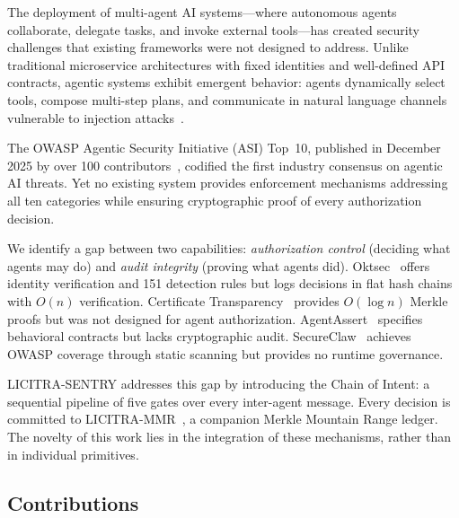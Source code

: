 \documentclass[11pt,a4paper]{article}
\begin{document}
The deployment of multi-agent AI systems---where autonomous agents collaborate, delegate
tasks, and invoke external tools---has created security challenges that existing frameworks
were not designed to address. Unlike traditional microservice architectures with fixed
identities and well-defined API contracts, agentic systems exhibit emergent behavior: agents
dynamically select tools, compose multi-step plans, and communicate in natural language
channels vulnerable to injection attacks~\cite{owasp}.

The OWASP Agentic Security Initiative (ASI) Top~10, published in December 2025 by over
100 contributors~\cite{owasp}, codified the first industry consensus on agentic AI threats.
Yet no existing system provides enforcement mechanisms addressing all ten categories while ensuring
cryptographic proof of every authorization decision.

We identify a gap between two capabilities: \emph{authorization control} (deciding what
agents may do) and \emph{audit integrity} (proving what agents did). Oktsec~\cite{oktsec}
offers identity verification and 151 detection rules but logs decisions in flat hash chains
with $O(n)$ verification. Certificate Transparency~\cite{ct} provides $O(\log n)$ Merkle
proofs but was not designed for agent authorization. AgentAssert~\cite{agentassert} specifies
behavioral contracts but lacks cryptographic audit. SecureClaw~\cite{secureclaw} achieves
OWASP coverage through static scanning but provides no runtime governance.

LICITRA-SENTRY addresses this gap by introducing the Chain of Intent: a sequential
pipeline of five gates over every inter-agent message. Every decision is committed to
LICITRA-MMR~\cite{licitrammr}, a companion Merkle Mountain Range ledger. The novelty of
this work lies in the integration of these mechanisms, rather than in individual primitives.

\subsection{Contributions}
\end{document}
